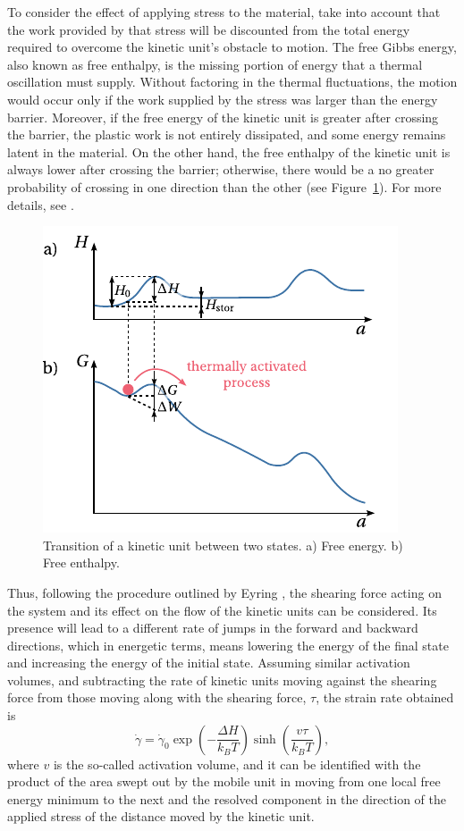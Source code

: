 To consider the effect of applying stress to the material, take into account that the work provided by that stress will be discounted from the total energy required to overcome the kinetic unit's obstacle to motion.
The free Gibbs energy, also known as free enthalpy, is the missing portion of energy that a thermal oscillation must supply.
Without factoring in the thermal fluctuations, the motion would occur only if the work supplied by the stress was larger than the energy barrier.
Moreover, if the free energy of the kinetic unit is greater after crossing the barrier, the plastic work is not entirely dissipated, and some energy remains latent in the material.
On the other hand, the free enthalpy of the kinetic unit is always lower after crossing the barrier; otherwise, there would be a no greater probability of crossing in one direction than the other (see Figure~\ref{fig:site_model_theory}).
For more details, see \cite{kocks1975thermodynamics}.
\begin{figure}
	\centering
	\includegraphics{figures/site_model_theory}
	\caption{Transition of a kinetic unit between two states. a) Free energy. b) Free enthalpy.}
\label{fig:site_model_theory}
\end{figure}

Thus, following the procedure outlined by Eyring \citep{eyringViscosityPlasticityDiffusion1936}, the shearing force acting on the system and its effect on the flow of the kinetic units can be considered.
Its presence will lead to a different rate of jumps in the forward and backward directions, which in energetic terms, means lowering the energy of the final state and increasing the energy of the initial state.
Assuming similar activation volumes, and subtracting the rate of kinetic units moving against the shearing force from those moving along with the shearing force, $\tau$, the strain rate obtained is
\begin{equation}
	\label{eq:eyring_model}
	\dot \gamma = \dot\gamma_0 \exp\left(-\frac{\Delta H}{k_BT}\right)\sinh\left(\frac{v\tau}{k_BT}\right),
\end{equation}
where $v$ is the so-called activation volume, and it can be identified with the product of the area swept out by the mobile unit in moving from one local free energy minimum to the next and the resolved component in the direction of the applied stress of the distance moved by the kinetic unit.

